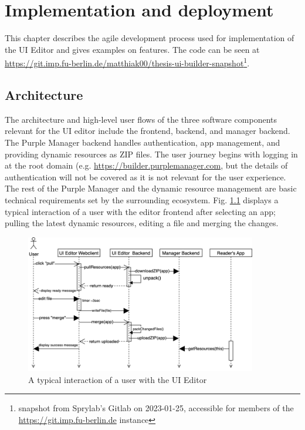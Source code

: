 
%
\chapter{Implementation and deployment}
\label{chap:impl} 

This chapter describes the agile development process used for implementation of the UI Editor and gives examples on features. The code can be seen at \url{https://git.imp.fu-berlin.de/matthiak00/thesis-ui-builder-snapshot}\footnote{snapshot from Sprylab's Gitlab on 2023-01-25, accessible for members of the \url{https://git.imp.fu-berlin.de} instance}.


\section{Architecture}

The architecture and high-level user flows of the three software components relevant for the UI editor include the frontend, backend, and \Gls{manager} backend. The Purple Manager backend handles authentication, app management, and providing dynamic resources as ZIP files. The user journey begins with logging in at the root domain (e.g. \url{https://builder.purplemanager.com}, but the details of authentication will not be covered as it is not relevant for the user experience. The \Gls{rest} of the Purple Manager and the dynamic resource management are basic technical requirements set by the surrounding ecosystem.
Fig. \ref{fig:userflow} displays a typical interaction of a user with the editor frontend after selecting an app; pulling the latest dynamic resources, editing a file and merging the changes.
\begin{figure}[h!]
  \centering
  \includegraphics[width=0.9\textwidth]{pics/user-flow.uml.drawio.png}
  \caption{A typical interaction of a user with the UI Editor}
  \label{fig:userflow}
\end{figure}
\pagebreak
